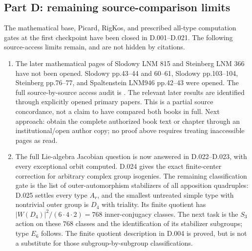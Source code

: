 \subsection*{Part D: remaining source-comparison limits}
The mathematical base, Picard, RigKos, and prescribed all-type computation
gates at the first checkpoint have been closed in D.001--D.021.
The following source-access limits remain, and are not hidden by citations.
\begin{enumerate}
\item[D.G4] The later mathematical pages of Slodowy LNM 815 and
Steinberg LNM 366 have not been opened.  Slodowy pp.43--44 and 60--61,
Slodowy pp.103--104, Steinberg pp.76--77, and Spaltenstein
LNM946 pp.42--43 were opened.  The full source-by-source access audit is
. The relevant later results are
identified through explicitly opened primary papers.  This is a
partial source concordance, not a claim to have compared both books
in full.  Next approach: obtain the complete authorized book text
or chapter through an institutional/open author copy; no proof above
requires treating inaccessible pages as read.
\item[D.G6] The full Lie-algebra Jacobian question is now answered in
D.022--D.023, with every exceptional orbit computed.  D.024 gives the
exact finite-center correction for arbitrary complex group isogenies.
The remaining classification gate is the list of outer-automorphism
stabilizers of all apposition quadruples: D.025 settles every type $A_r$, and
the smallest untreated simple type with nontrivial outer group is
$D_4$ with triality.  Its finite quotient has
$|W(D_4)|^2/(6\cdot4\cdot2)=768$ inner-conjugacy classes.
The next task is the $S_3$ action on these $768$ classes and
the identification of its stabilizer subgroups; type $E_6$ follows.
The finite quotient description in D.004 is proved, but is not a
substitute for those subgroup-by-subgroup classifications.
\end{enumerate}
